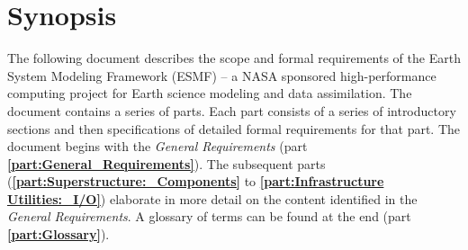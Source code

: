 \section{Synopsis}

The following document describes the scope and formal requirements
of the Earth System Modeling Framework (ESMF) -- a NASA sponsored 
high-performance computing project for Earth science modeling and 
data assimilation. The document contains a series of parts.
Each part consists of a series of introductory
sections and then specifications of detailed formal requirements
for that part. The document begins with the {\it General Requirements}
(part {\bf \ref{part:General_Requirements}}). The subsequent parts 
({\bf \ref{part:Superstructure:_Components}} to {\bf \ref{part:Infrastructure Utilities:_I/O}}) elaborate in more detail on the content identified in
the {\it General Requirements}.
A glossary of terms can be found at the end (part {\bf \ref{part:Glossary}}).







